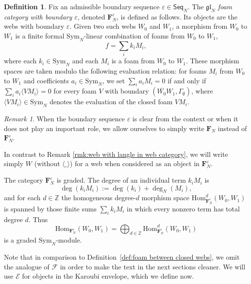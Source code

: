 \documentclass[12pt]{amsart}
\theoremstyle{definition}
\newtheorem{definition}[theorem]{Definition}
\theoremstyle{remark}
\newtheorem{remark}[theorem]{Remark}
\numberwithin{equation}{section}
\numberwithin{figure}{section}
\newcommand{\Hom}{\mathrm{Hom}}
\newcommand{\emptyweb}{\Gamma_{\emptyset}}
\newcommand{\Seq}{\mathsf{Seq}}
\newcommand{\Symf}{\mathrm{Sym}_N}
\newcommand{\Foam}{\mathbf{F}_N}
\newcommand{\foamdeg}{\deg_N}
\begin{document}
\begin{definition}
Fix an admissible boundary sequence $\varepsilon\in\Seq_N$. The
\emph{$\mathfrak{gl}_N$ foam category with boundary $\varepsilon$}, denoted
$\Foam^\varepsilon$, is defined as follows. Its objects are the webs with
boundary $\varepsilon$. Given two such webs $W_0$ and $W_1$, a morphism from
$W_0$ to $W_1$ is a finite formal $\Symf$-linear combination of foams from
$W_0$ to $W_1$,
\[
f=\sum_i k_iM_i,
\]
where each $k_i\in\Symf$ and each $M_i$ is a foam from $W_0$ to $W_1$.
These morphism spaces are taken modulo the following evaluation relation:
for foams $M_i$ from $W_0$ to $W_1$ and coefficients $a_i\in\Symf$, we set
$\sum_i a_iM_i=0$ if and only if
$\sum_i a_i\langle VM_i\rangle=0$ for every foam $V$ with boundary
$(\overline{W_0}W_1,\emptyweb)$, where
$\langle VM_i\rangle\in\Symf$ denotes the evaluation of the closed foam
$VM_i$.
\end{definition}

\begin{remark}
When the boundary sequence $\varepsilon$ is clear from the context or when it does not play an important role, we allow ourselves to simply write $\Foam$ instead of $\Foam^\varepsilon$. 

In contrast to Remark \ref{rmk:web with langle in web category}, we will write simply $W$ (without $\langle\_\rangle$) for a web when considered as an object in $\Foam^\varepsilon$.
\end{remark}

The category $\Foam^\varepsilon$ is graded. The degree of an individual term
$k_iM_i$ is
\[
\deg(k_iM_i):=\deg(k_i)+\foamdeg(M_i),
\]
and for each $d\in\mathbb{Z}$ the homogeneous degree-$d$ morphism space
$\Hom_{\Foam^\varepsilon}^d(W_0,W_1)$ is spanned by those finite sums
$\sum_i k_iM_i$ in which every nonzero term has total degree $d$. Thus
\[
\Hom_{\Foam^\varepsilon}(W_0,W_1)
=\bigoplus_{d\in\mathbb{Z}}\Hom_{\Foam^\varepsilon}^d(W_0,W_1)
\]
is a graded $\Symf$-module.

Note that in comparison to Definition~\ref{def:foam between closed webs}, we
omit the analogue of $\mathcal{F}$ in order to make the text in the next
sections cleaner. We will use $\mathcal{E}$ for objects in the Karoubi
envelope, which we define now.
\end{document}
